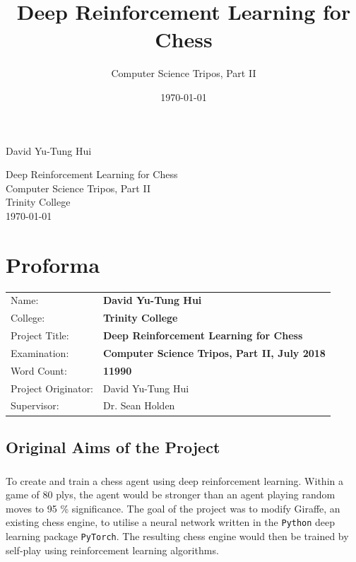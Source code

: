 \documentclass[12pt,a4paper]{book}
\title{Deep Reinforcement Learning for Chess}
\date{\today}
\author{Computer Science Tripos, Part II}
\begin{document}
\pagestyle{empty}

\hfill{\LARGE David Yu-Tung Hui}

\vspace*{80mm}
\begin{center}
\LARGE
{Deep Reinforcement Learning for Chess} \\
\large
\vspace*{10mm}
Computer Science Tripos, Part II \\
\vspace*{5mm}
Trinity College \\
\vspace*{5mm}
\today
\end{center}

\cleardoublepage


\setcounter{page}{1}
\pagestyle{plain}


\chapter*{Proforma}

{\large
  \begin{tabular}{ll}
    Name:               & \bf David Yu-Tung Hui\\
    College:            & \bf Trinity College\\
    Project Title:      & \bf Deep Reinforcement Learning for Chess\\
    Examination:        & \bf Computer Science Tripos, Part II, July 2018\\
    Word Count:         & \bf 11990 \footnotemark[1]\\
    Project Originator: & David Yu-Tung Hui\\
    Supervisor:         & Dr. Sean Holden\\ 
  \end{tabular}
}



\section*{Original Aims of the Project}

\paragraph{} To create and train a chess agent using deep reinforcement learning. Within a game of 80 plys, the agent would be stronger than an agent playing random moves to 95 \% significance. The goal of the project was to modify Giraffe, an existing chess engine, to utilise a neural network written in the \texttt{Python} deep learning package \texttt{PyTorch}. The resulting chess engine would then be trained by self-play using reinforcement learning algorithms.
\end{document}
